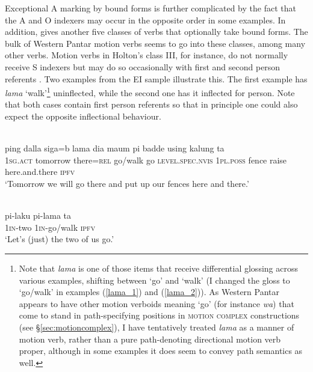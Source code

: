 Exceptional A marking by bound forms is further complicated by the fact that the A and O indexers may occur in the opposite order in some examples. In addition, \citet{holton2010person} gives another five classes of verbs that optionally take bound forms. The bulk of Western Pantar motion verbs seems to go into these classes, among many other verbs. Motion verbs in Holton's class III, for instance, do not normally receive S indexers but may do so occasionally with first and second person referents \citep[109]{holton2010person}. Two examples from the EI sample illustrate this. The first example has \textit{lama} `walk'\footnote{Note that \textit{lama} is one of those items that receive differential glossing across various examples, shifting between `go' and `walk' (I changed the gloss to `go/walk' in examples (\ref{lama_1}) and (\ref{lama_2})). As Western Pantar appears to have other motion verboids meaning `go' (for instance \textit{wa}) that come to stand in path-specifying positions in \textsc{motion complex} constructions (see §\ref{sec:motioncomplex}), I have tentatively treated \textit{lama} as a manner of motion verb, rather than a pure path-denoting directional motion verb proper, although in some examples it does seem to convey path semantics as well.} uninflected, while the second one has it inflected for person. Note that both cases contain first person referents so that in principle one could also expect the opposite inflectional behaviour.

\ea \label{lama_1}
\\
\gll ping dalla siga=b lama dia maum pi badde using kalung ta \\
1\textsc{sg}.\textsc{act} tomorrow there=\textsc{rel} go/walk go \textsc{level.spec.nvis} 1\textsc{pl}.\textsc{poss} fence raise here.and.there \textsc{ipfv} \\
\glft `Tomorrow we will go there and put up our fences here and there.'\\ 
\z

\ea \label{lama_2}
\\
\gll pi-laku pi-lama ta \\
1\textsc{in}-two 1\textsc{in}-go/walk \textsc{ipfv} \\
\glft `Let's (just) the two of us go.'\\ 
\z

